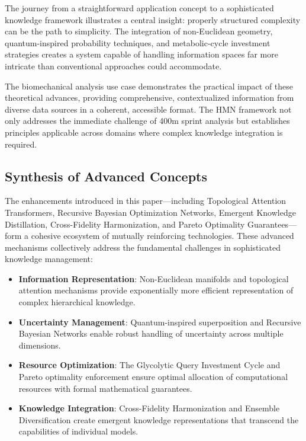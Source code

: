 \documentclass[journal,onecolumn]{IEEEtran}
\begin{document}
The journey from a straightforward application concept to a sophisticated knowledge framework illustrates a central insight: properly structured complexity can be the path to simplicity. The integration of non-Euclidean geometry, quantum-inspired probability techniques, and metabolic-cycle investment strategies creates a system capable of handling information spaces far more intricate than conventional approaches could accommodate.

The biomechanical analysis use case demonstrates the practical impact of these theoretical advances, providing comprehensive, contextualized information from diverse data sources in a coherent, accessible format. The HMN framework not only addresses the immediate challenge of 400m sprint analysis but establishes principles applicable across domains where complex knowledge integration is required.

\subsection{Synthesis of Advanced Concepts}

The enhancements introduced in this paper—including Topological Attention Transformers, Recursive Bayesian Optimization Networks, Emergent Knowledge Distillation, Cross-Fidelity Harmonization, and Pareto Optimality Guarantees—form a cohesive ecosystem of mutually reinforcing technologies. These advanced mechanisms collectively address the fundamental challenges in sophisticated knowledge management:

\begin{itemize}
\item \textbf{Information Representation}: Non-Euclidean manifolds and topological attention mechanisms provide exponentially more efficient representation of complex hierarchical knowledge.

\item \textbf{Uncertainty Management}: Quantum-inspired superposition and Recursive Bayesian Networks enable robust handling of uncertainty across multiple dimensions.

\item \textbf{Resource Optimization}: The Glycolytic Query Investment Cycle and Pareto optimality enforcement ensure optimal allocation of computational resources with formal mathematical guarantees.

\item \textbf{Knowledge Integration}: Cross-Fidelity Harmonization and Ensemble Diversification create emergent knowledge representations that transcend the capabilities of individual models.
\end{itemize}
\end{document}
